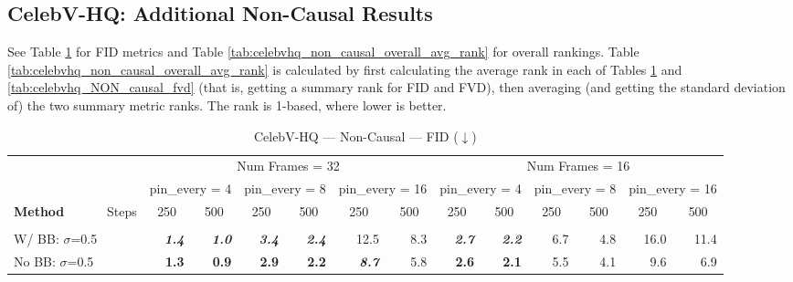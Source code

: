 \subsection{CelebV-HQ: Additional Non-Causal Results}\label{subsec:celebvhq_additional_non_causal}

See Table \ref{tab:celebvhq_NON_causal_fid} for FID metrics and Table \ref{tab:celebvhq_non_causal_overall_avg_rank} for overall rankings.
Table \ref{tab:celebvhq_non_causal_overall_avg_rank} is calculated by first calculating the average rank in each of Tables \ref{tab:celebvhq_NON_causal_fid} and \ref{tab:celebvhq_NON_causal_fvd} (that is, getting a summary rank for FID and FVD), then averaging (and getting the standard deviation of) the two summary metric ranks. The rank is 1-based, where lower is better.

\begin{table}[hbp]
\centering\tiny
\caption{CelebV-HQ --- Non-Causal --- FID ($\downarrow$)}\label{tab:celebvhq_NON_causal_fid}
\begin{tabular}{lrrrrrrrrrrrr}
\toprule
 & \multicolumn{6}{c}{Num Frames = 32} & \multicolumn{6}{c}{Num Frames = 16} \\
\cmidrule(lr){2-7} \cmidrule(lr){8-13}
 & \multicolumn{2}{c}{pin\_every = 4} & \multicolumn{2}{c}{pin\_every = 8} & \multicolumn{2}{c}{pin\_every = 16} & \multicolumn{2}{c}{pin\_every = 4} & \multicolumn{2}{c}{pin\_every = 8} & \multicolumn{2}{c}{pin\_every = 16} \\
\cmidrule(lr){2-3} \cmidrule(lr){4-5} \cmidrule(lr){6-7} \cmidrule(lr){8-9} \cmidrule(lr){10-11} \cmidrule(lr){12-13}
\textbf{Method} \ \ \ \ \ \ Steps & \multicolumn{1}{c}{250} & \multicolumn{1}{c}{500} & \multicolumn{1}{c}{250} & \multicolumn{1}{c}{500} & \multicolumn{1}{c}{250} & \multicolumn{1}{c}{500} & \multicolumn{1}{c}{250} & \multicolumn{1}{c}{500} & \multicolumn{1}{c}{250} & \multicolumn{1}{c}{500} & \multicolumn{1}{c}{250} & \multicolumn{1}{c}{500} \\
\midrule
\rowcolor{gray!20} \multicolumn{13}{l}{\textit{ABC}} \\
\quad W/ BB: $\sigma$=0.5 & \textbf{\textit{1.4}} & \textbf{\textit{1.0}} & \textbf{\textit{3.4}} & \textbf{\textit{2.4}} & 12.5 & 8.3 & \textbf{\textit{2.7}} & \textbf{\textit{2.2}} & 6.7 & 4.8 & 16.0 & 11.4 \\
\quad No BB: $\sigma$=0.5 & \textbf{1.3} & \textbf{0.9} & \textbf{2.9} & \textbf{2.2} & \textbf{\textit{8.7}} & 5.8 & \textbf{2.6} & \textbf{2.1} & 5.5 & 4.1 & 9.6 & 6.9 \\

\end{tabular}
\end{table}
